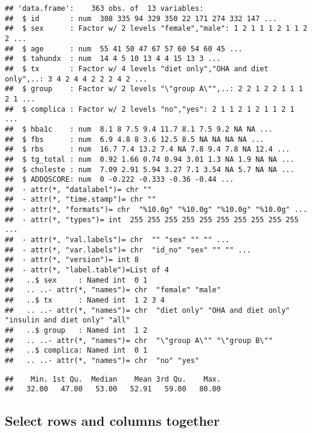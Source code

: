 \documentclass[]{book}
\newenvironment{Shaded}{\begin{snugshade}}{\end{snugshade}}
\newcommand{\KeywordTok}[1]{\textcolor[rgb]{0.13,0.29,0.53}{\textbf{#1}}}
\newcommand{\OperatorTok}[1]{\textcolor[rgb]{0.81,0.36,0.00}{\textbf{#1}}}
\newcommand{\NormalTok}[1]{#1}
\theoremstyle{definition}
\theoremstyle{definition}
\theoremstyle{remark}
\begin{document}
\begin{verbatim}
## 'data.frame':    363 obs. of  13 variables:
##  $ id       : num  308 335 94 329 350 22 171 274 332 147 ...
##  $ sex      : Factor w/ 2 levels "female","male": 1 2 1 1 1 2 1 1 2 2 ...
##  $ age      : num  55 41 50 47 67 57 60 54 60 45 ...
##  $ tahundx  : num  14 4 5 10 13 4 4 15 13 3 ...
##  $ tx       : Factor w/ 4 levels "diet only","OHA and diet only",..: 3 4 2 4 4 2 2 2 4 2 ...
##  $ group    : Factor w/ 2 levels "\"group A\"",..: 2 2 1 2 2 1 1 1 2 1 ...
##  $ complica : Factor w/ 2 levels "no","yes": 2 1 1 2 1 2 1 1 2 1 ...
##  $ hba1c    : num  8.1 8 7.5 9.4 11.7 8.1 7.5 9.2 NA NA ...
##  $ fbs      : num  6.9 4.8 8 3.6 12.5 8.5 NA NA NA NA ...
##  $ rbs      : num  16.7 7.4 13.2 7.4 NA 7.8 9.4 7.8 NA 12.4 ...
##  $ tg_total : num  0.92 1.66 0.74 0.94 3.01 1.3 NA 1.9 NA NA ...
##  $ choleste : num  7.09 2.91 5.94 3.27 7.1 3.54 NA 5.7 NA NA ...
##  $ ADDQSCORE: num  0 -0.222 -0.333 -0.36 -0.44 ...
##  - attr(*, "datalabel")= chr ""
##  - attr(*, "time.stamp")= chr ""
##  - attr(*, "formats")= chr  "%10.0g" "%10.0g" "%10.0g" "%10.0g" ...
##  - attr(*, "types")= int  255 255 255 255 255 255 255 255 255 255 ...
##  - attr(*, "val.labels")= chr  "" "sex" "" "" ...
##  - attr(*, "var.labels")= chr  "id_no" "sex" "" "" ...
##  - attr(*, "version")= int 8
##  - attr(*, "label.table")=List of 4
##   ..$ sex     : Named int  0 1
##   .. ..- attr(*, "names")= chr  "female" "male"
##   ..$ tx      : Named int  1 2 3 4
##   .. ..- attr(*, "names")= chr  "diet only" "OHA and diet only" "insulin and diet only" "all"
##   ..$ group   : Named int  1 2
##   .. ..- attr(*, "names")= chr  "\"group A\"" "\"group B\""
##   ..$ complica: Named int  0 1
##   .. ..- attr(*, "names")= chr  "no" "yes"
\end{verbatim}

\begin{Shaded}
\end{Shaded}

\begin{verbatim}
##    Min. 1st Qu.  Median    Mean 3rd Qu.    Max. 
##   32.00   47.00   53.00   52.91   59.00   80.00
\end{verbatim}

\subsection{Select rows and columns
together}\label{select-rows-and-columns-together}
\end{document}
